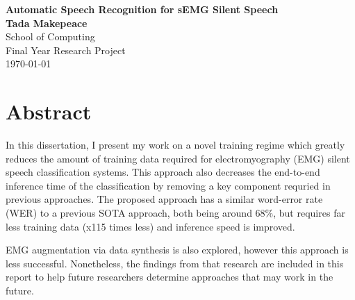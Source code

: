 \documentclass[12pt, a4paper]{report}
\begin{document}
\thispagestyle{empty}	%
\vspace*{1mm}	%
\vspace{10mm}

\begin{center}
\huge\textbf{\textsf{Automatic Speech Recognition for sEMG Silent Speech}}\\
\vspace{15mm}
\large \textbf{Tada Makepeace}\\


\vspace{10mm}
\normalsize School of Computing \\ Final Year Research Project \\

\vspace{20mm}
%
\today	%
\end{center}
\newpage
{}	%
\chapter*{Abstract}	%

In this dissertation, I present my work on a novel training regime which greatly
reduces the amount of training data required for electromyography (EMG)
silent speech classification
systems. This approach also decreases the end-to-end inference time of the classification
by removing a key component requried in previous approaches. The proposed approach
has a similar word-error rate (WER) to a previous SOTA approach,
both being around 68\%,
but requires far less training data (x115 times less)
and inference speed is improved.

EMG augmentation
via data synthesis is also explored, however this approach is less successful.
Nonetheless, the findings from that research are included in this report to help
future researchers determine approaches that may work in the future.
\end{document}
